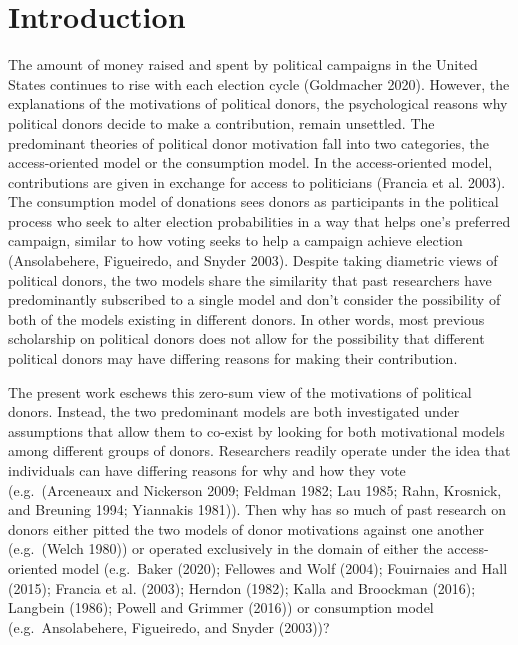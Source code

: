 \documentclass[12pt,]{article}
\begin{document}
\hypertarget{introduction}{%
\section{Introduction}\label{introduction}}

The amount of money raised and spent by political campaigns in the
United States continues to rise with each election cycle (Goldmacher
2020). However, the explanations of the motivations of political donors,
the psychological reasons why political donors decide to make a
contribution, remain unsettled. The predominant theories of political
donor motivation fall into two categories, the access-oriented model or
the consumption model. In the access-oriented model, contributions are
given in exchange for access to politicians (Francia et al. 2003). The
consumption model of donations sees donors as participants in the
political process who seek to alter election probabilities in a way that
helps one's preferred campaign, similar to how voting seeks to help a
campaign achieve election (Ansolabehere, Figueiredo, and Snyder 2003).
Despite taking diametric views of political donors, the two models share
the similarity that past researchers have predominantly subscribed to a
single model and don't consider the possibility of both of the models
existing in different donors. In other words, most previous scholarship
on political donors does not allow for the possibility that different
political donors may have differing reasons for making their
contribution.

The present work eschews this zero-sum view of the motivations of
political donors. Instead, the two predominant models are both
investigated under assumptions that allow them to co-exist by looking
for both motivational models among different groups of donors.
Researchers readily operate under the idea that individuals can have
differing reasons for why and how they vote (e.g.~(Arceneaux and
Nickerson 2009; Feldman 1982; Lau 1985; Rahn, Krosnick, and Breuning
1994; Yiannakis 1981)). Then why has so much of past research on donors
either pitted the two models of donor motivations against one another
(e.g.~(Welch 1980)) or operated exclusively in the domain of either the
access-oriented model (e.g.~Baker (2020); Fellowes and Wolf (2004);
Fouirnaies and Hall (2015); Francia et al. (2003); Herndon (1982); Kalla
and Broockman (2016); Langbein (1986); Powell and Grimmer (2016)) or
consumption model (e.g.~Ansolabehere, Figueiredo, and Snyder (2003))?
\end{document}
